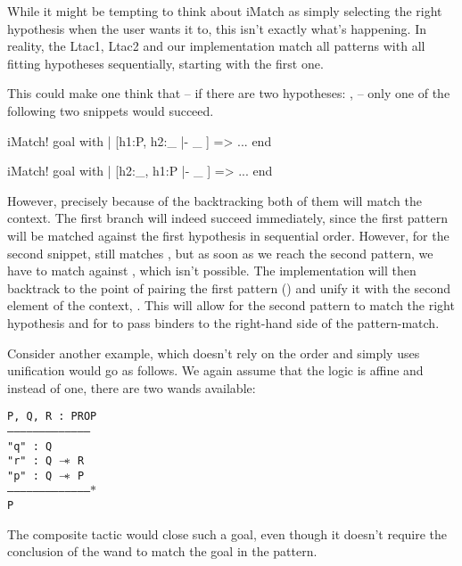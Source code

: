 While it might be tempting to think about iMatch as simply selecting the right hypothesis when the user wants it to, this isn't exactly what's happening.
In reality, the Ltac1, Ltac2 and our implementation match all patterns with all fitting hypotheses sequentially, starting with the first one.

This could make one think that -- if there are two hypotheses: ,  -- only one of the following two snippets would succeed.
\begin{coq}
  iMatch! goal with
  | [h1:P, h2:_ |- _ ] => ...
  end
\end{coq}
\begin{coq}
  iMatch! goal with
  | [h2:_, h1:P |- _ ] => ...
  end
\end{coq}

However, precisely because of the backtracking both of them will match the context.
The first branch will indeed succeed immediately, since the first pattern will be matched against the first hypothesis in sequential order.
However, for the second snippet,  still matches \coqe{_}, but as soon as we reach the second pattern, we have to match  against , which isn't possible.
The implementation will then backtrack to the point of pairing the first pattern (\coqe{_}) and unify it with the second element of the context, .
This will allow for the second pattern to match the right hypothesis and for  to pass binders to the right-hand side of the pattern-match.

Consider another example, which doesn't rely on the order and simply uses unification would go as follows.
We again assume that the logic is affine and instead of one, there are two wands available:

\begin{minipage}{\linewidth}
\texttt{P, Q, R : PROP\\
---------------------------------------\\
"q" : Q\\
"r" : Q $\mathrel{-\mkern-6mu*}$ R\\
"p" : Q $\mathrel{-\mkern-6mu*}$ P\\
--------------------------------------$\ast$\\
P
}
\end{minipage}

The composite tactic  would close such a goal, even though it doesn't require the conclusion of the wand to match the goal in the pattern.

